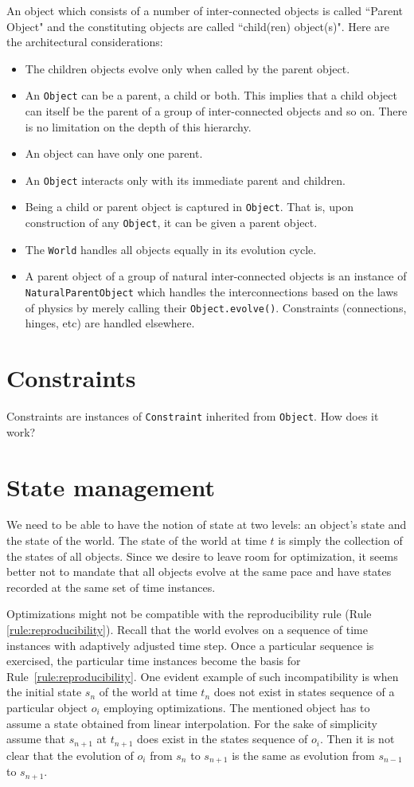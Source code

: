 \documentclass[a4paper]{report}
\newcommand{\ai}[1]{{\color{blue}#1}}
\begin{document}
An object which consists of a number of inter-connected objects is called ``Parent Object" and the constituting objects are called ``child(ren) object(s)". Here are the architectural considerations:
\begin{itemize}
	\item The children objects evolve only when called by the parent object. 
	\item An \verb+Object+ can be a parent, a child or both. This implies that a child object can itself be the parent of a group of inter-connected objects and so on. There is no limitation on the depth of this hierarchy.
	\item An object can have only one parent.
	\item An \verb+Object+ interacts only with its immediate parent and children.
	\item Being a child or parent object is captured in \verb+Object+. That is, upon construction of any \verb+Object+, it can be given a parent object. 
	\item The \verb+World+ handles all objects equally in its evolution cycle.
	\item A parent object of a group of natural inter-connected objects is an instance of \verb+NaturalParentObject+ which handles the interconnections based on the laws of physics by merely calling their \verb+Object.evolve()+. Constraints (connections, hinges, etc) are handled elsewhere. 
\end{itemize}

\chapter{Constraints}
Constraints are instances of \verb+Constraint+ inherited from \verb+Object+. \ai{How does it work?}

\chapter{State management}
We need to be able to have the notion of state at two levels: an object's state and the state of the world. The state of the world at time $t$ is simply the collection of the states of all objects. Since we desire to leave room for optimization, it seems better not to mandate that all objects evolve at the same pace and have states recorded at the same set of time instances.

Optimizations might not be compatible with the reproducibility rule (Rule \ref{rule:reproducibility}). Recall that the world evolves on a sequence of time instances with adaptively adjusted time step. Once a particular sequence is exercised, the particular time instances become the basis for Rule~\ref{rule:reproducibility}. One evident example of such incompatibility is when the initial state $s_n$ of the world at time $t_n$ does not exist in states sequence of a particular object $o_i$ employing optimizations. The mentioned object has to assume a state obtained from linear interpolation. For the sake of simplicity assume that $s_{n+1}$ at $t_{n+1}$ does exist in the states sequence of $o_i$. Then it is not clear that the evolution of $o_i$ from $s_n$ to $s_{n+1}$ is the same as evolution from $s_{n-1}$ to $s_{n+1}$. 
\end{document}
